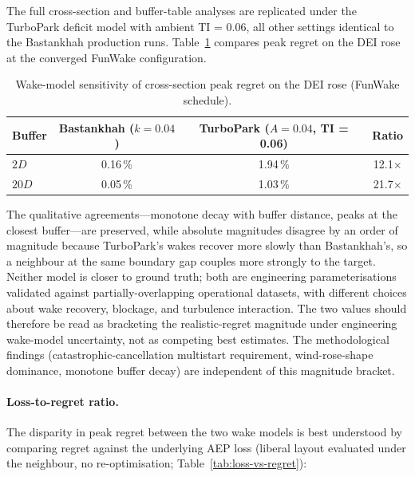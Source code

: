 \documentclass[wes, manuscript]{copernicus}
\begin{document}
The full cross-section and buffer-table analyses are replicated under the TurboPark deficit model \citep{Nygaard2022} with ambient TI = 0.06, all other settings identical to the Bastankhah production runs.
Table~\ref{tab:robustness} compares peak regret on the DEI rose at the converged FunWake configuration.

\begin{table}[htbp]
    \centering
    \caption{Wake-model sensitivity of cross-section peak regret on the DEI rose (FunWake schedule).}
    \label{tab:robustness}
    \begin{tabular}{lccc}
        \toprule
        Buffer & Bastankhah ($k = 0.04$) & TurboPark ($A = 0.04$, TI = 0.06) & Ratio \\
        \midrule
        $2D$  & 0.16\,\% & 1.94\,\% & 12.1$\times$ \\
        $20D$ & 0.05\,\% & 1.03\,\% & 21.7$\times$ \\
        \bottomrule
    \end{tabular}
\end{table}

The qualitative agreements---monotone decay with buffer distance, peaks at the closest buffer---are preserved, while absolute magnitudes disagree by an order of magnitude because TurboPark's wakes recover more slowly than Bastankhah's, so a neighbour at the same boundary gap couples more strongly to the target.
Neither model is closer to ground truth; both are engineering parameterisations validated against partially-overlapping operational datasets, with different choices about wake recovery, blockage, and turbulence interaction.
The two values should therefore be read as bracketing the realistic-regret magnitude under engineering wake-model uncertainty, not as competing best estimates.
The methodological findings (catastrophic-cancellation multistart requirement, wind-rose-shape dominance, monotone buffer decay) are independent of this magnitude bracket.

\paragraph{Loss-to-regret ratio.}
The disparity in peak regret between the two wake models is best understood by comparing regret against the underlying AEP loss (liberal layout evaluated under the neighbour, no re-optimisation; Table~\ref{tab:loss-vs-regret}):
\end{document}

